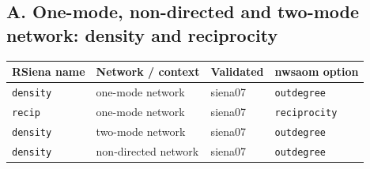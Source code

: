 \subsection*{A. One-mode, non-directed and two-mode network: density and reciprocity}
\footnotesize
\begin{longtable}{@{}p{2.6cm}p{3.2cm}p{2.9cm}p{5.4cm}@{}}
\toprule
RSiena name & Network / context & Validated & nwsaom option\\
\midrule
\endhead
\texttt{density} & one-mode network & siena07 & \texttt{outdegree}\\
\texttt{recip} & one-mode network & siena07 & \texttt{reciprocity}\\
\texttt{density} & two-mode network & siena07 & \texttt{outdegree}\\
\texttt{density} & non-directed network & siena07 & \texttt{outdegree}\\
\bottomrule
\end{longtable}
\normalsize

